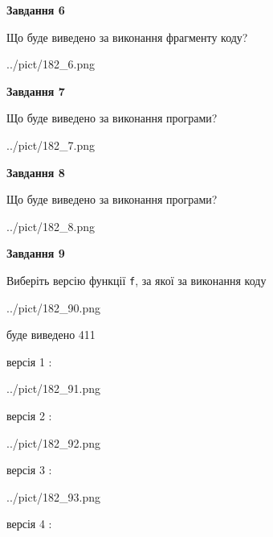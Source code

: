 \documentclass[12pt, ukrainian]{article}
\def\code#1{\Verb!#1!}
\begin{document}
{\begin {large}
{\begin {center}\textbf{Завдання 6}\end {center}}

Що буде виведено за виконання фрагменту коду?\par
\begin{center}
	{../pict/182_6.png}
\end{center}
\newpage

{\begin {center}\textbf{Завдання 7}\end {center}}

Що буде виведено за виконання програми?\par
\begin{center}
	{../pict/182_7.png}
\end{center}
\newpage

{\begin {center}\textbf{Завдання 8}\end {center}}

Що буде виведено за виконання програми?\par
\begin{center}
	{../pict/182_8.png}
\end{center}
\newpage

{\begin {center}\textbf{Завдання 9}\end {center}}

Виберіть версію функції \code{f}, за якої за виконання коду
\begin{center}
	{../pict/182_90.png}
\end{center}
буде виведено 411

\vspace{5mm}
версія 1 :

\begin{center}
	{../pict/182_91.png}
\end{center}
версія 2 :

\begin{center}
	{../pict/182_92.png}
\end{center}
версія 3 :

\begin{center}
	{../pict/182_93.png}
\end{center}
версія 4 :


\end{large}}
\end{document}

